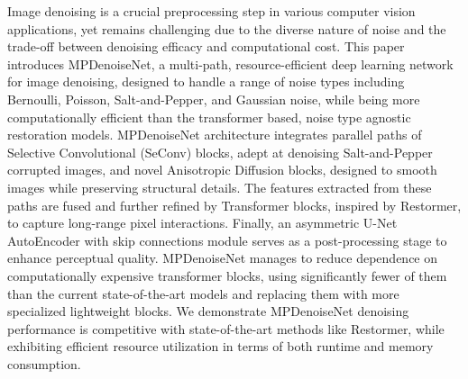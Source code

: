 Image denoising is a crucial preprocessing step in various computer vision applications, yet remains challenging due to the diverse nature of noise and the trade-off between denoising efficacy and computational cost. This paper introduces MPDenoiseNet, a multi-path, resource-efficient deep learning network for image denoising, designed to handle a range of noise types including Bernoulli, Poisson, Salt-and-Pepper, and Gaussian noise, while being more computationally efficient than the transformer based, noise type agnostic restoration models. MPDenoiseNet architecture integrates parallel paths of Selective Convolutional (SeConv) blocks, adept at denoising Salt-and-Pepper corrupted images, and novel Anisotropic Diffusion blocks, designed to smooth images while preserving structural details. The features extracted from these paths are fused and further refined by Transformer blocks, inspired by Restormer, to capture long-range pixel interactions. Finally, an asymmetric U-Net AutoEncoder with skip connections module serves as a post-processing stage to enhance perceptual quality. MPDenoiseNet manages to reduce dependence on computationally expensive transformer blocks, using significantly fewer of them than the current state-of-the-art models and replacing them with more specialized lightweight blocks. We demonstrate MPDenoiseNet denoising performance is competitive with state-of-the-art methods like Restormer, while exhibiting efficient resource utilization in terms of both runtime and memory consumption.
